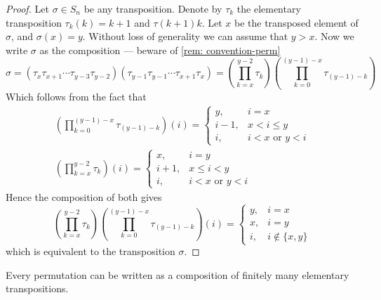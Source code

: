 \begin{proof}
    Let \(\sigma \in S_n\) be any transposition. Denote by \(\tau_k\) the
    elementary transposition \(\tau_k(k) = k + 1\) and \(\tau(k + 1) k\). Let
    \(x\) be the transposed element of \(\sigma\), and \(\sigma(x) = y\). Without
    loss of generality we can assume that \(y > x\). Now we write \(\sigma\) as
    the composition --- beware of \cref{rem: convention-perm}
    \[
        \sigma = \left(\tau_x \tau_{x + 1} \cdots \tau_{y - 3} \tau_{y - 2} \right)
        \left( \tau_{y - 1} \tau_{y - 1} \cdots \tau_{x + 1} \tau_{x} \right)
        = \left( \prod_{k = x}^{y-2} \tau_k \right)
        \left( \prod_{k = 0}^{(y - 1) - x} \tau_{(y-1) - k} \right)
    \]
    Which follows from the fact that
    \begin{gather*}
        \left( \prod_{k = 0}^{(y - 1) - x} \tau_{(y-1) - k} \right)(i) =
        \begin{cases}
            y,     & i = x                   \\
            i - 1, & x < i \leq y            \\
            i,     & i < x \text{ or } y < i
        \end{cases}
        \\
        \left( \prod_{k = x}^{y-2} \tau_k \right)(i) =
        \begin{cases}
            x,     & i = y                   \\
            i + 1, & x \leq i < y            \\
            i,     & i < x \text{ or } y < i
        \end{cases}
    \end{gather*}
    Hence the composition of both gives
    \[
        \left( \prod_{k = x}^{y-2} \tau_k \right)
        \left( \prod_{k = 0}^{(y - 1) - x} \tau_{(y-1) - k} \right)(i) =
        \begin{cases}
            y, & i = x              \\
            x, & i = y              \\
            i, & i \not\in \{x, y\}
        \end{cases}
    \]
    which is equivalent to the transposition \(\sigma\).
\end{proof}

\begin{corollary}
    Every permutation can be written as a composition of finitely many elementary
    transpositions.
\end{corollary}

